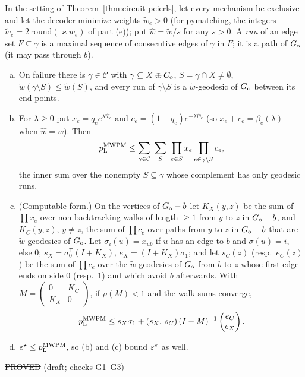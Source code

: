 \begin{theorem}\label{thm:geodesic}
In the setting of Theorem~\ref{thm:circuit-peierls}, let every mechanism be exclusive and let the decoder minimize weights $\tilde w_e>0$ (for pymatching, the integers $\tilde w_e=2\,\mathrm{round}(\varkappa w_e)$ of part (e)); put $\hat w=\tilde w/s$ for any $s>0$. A \emph{run} of an edge set $F\subseteq\gamma$ is a maximal sequence of consecutive edges of $\gamma$ in $F$; it is a path of $G_{\rm o}$ (it may pass through $b$).
\begin{enumerate}[(a)]
\item On failure there is $\gamma\in\mathcal C$ with $\gamma\subseteq X\oplus C_{\rm o}$, $S=\gamma\cap X\ne\emptyset$, $\tilde w(\gamma\setminus S)\le\tilde w(S)$, and every run of $\gamma\setminus S$ is a $\tilde w$-geodesic of $G_{\rm o}$ between its end points.
\item For $\lambda\ge0$ put $x_e=q_e e^{\lambda\hat w_e}$ and $c_e=(1-q_e)e^{-\lambda\hat w_e}$ (so $x_e+c_e=\beta_e(\lambda)$ when $\hat w=w$). Then
\[
p_{\mathrm{L}}^{\rm MWPM}\le\sum_{\gamma\in\mathcal C}\ \sum_{S}\ \prod_{e\in S}x_e\prod_{e\in\gamma\setminus S}c_e,
\]
the inner sum over the nonempty $S\subseteq\gamma$ whose complement has only geodesic runs.
\item (Computable form.) On the vertices of $G_{\rm o}-b$ let $K_X(y,z)$ be the sum of $\prod x_e$ over non-backtracking walks of length $\ge1$ from $y$ to $z$ in $G_{\rm o}-b$, and $K_C(y,z)$, $y\ne z$, the sum of $\prod c_e$ over paths from $y$ to $z$ in $G_{\rm o}-b$ that are $\tilde w$-geodesics of $G_{\rm o}$. Let $\sigma_i(u)=x_{ub}$ if $u$ has an edge to $b$ and $\sigma(u)=i$, else $0$; $s_X=\sigma_0^{\mathsf T}(I+K_X)$, $e_X=(I+K_X)\sigma_1$; and let $s_C(z)$ (resp.\ $e_C(z)$) be the sum of $\prod c_e$ over the $\tilde w$-geodesics of $G_{\rm o}$ from $b$ to $z$ whose first edge ends on side $0$ (resp.\ $1$) and which avoid $b$ afterwards. With $M=\begin{pmatrix}0&K_C\\K_X&0\end{pmatrix}$, if $\rho(M)<1$ and the walk sums converge,
\[
p_{\mathrm{L}}^{\rm MWPM}\le s_X\sigma_1+(s_X,\,s_C)\,(I-M)^{-1}\begin{pmatrix}e_C\\ e_X\end{pmatrix}.
\]
\item $\varepsilon^{\star}\le p_{\mathrm{L}}^{\rm MWPM}$, so (b) and (c) bound $\varepsilon^{\star}$ as well.
\end{enumerate}
\hfill\st{PROVED} (draft; checks G1--G3)
\end{theorem}
